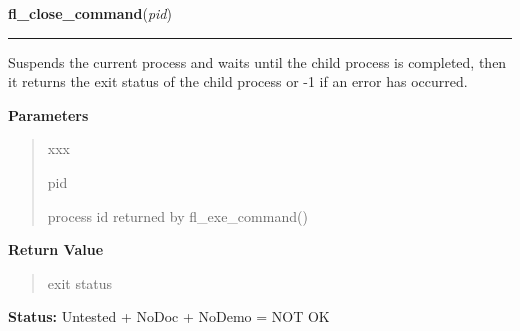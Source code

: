 \hspace{.8\funcindent}\begin{boxedminipage}{\funcwidth}

    \raggedright \textbf{fl\_close\_command}(\textit{pid})

    \vspace{-1.5ex}

    \rule{\textwidth}{0.5\fboxrule}
\setlength{\parskip}{2ex}
    Suspends the current process and waits until the child process is 
    completed, then it returns the exit status of the child process or -1 
    if an error has occurred.

\setlength{\parskip}{1ex}
      \textbf{Parameters}
      \vspace{-1ex}

      \begin{quote}
        \begin{Ventry}{xxx}

          \item[pid]

          process id returned by fl\_exe\_command()

        \end{Ventry}

      \end{quote}

      \textbf{Return Value}
    \vspace{-1ex}

      \begin{quote}
      exit status

      \end{quote}

\textbf{Status:} Untested + NoDoc + NoDemo = NOT OK



    \end{boxedminipage}

    \label{xformslib:flgoodies:fl_check_command}

    \vspace{0.5ex}

